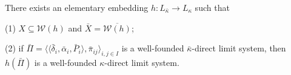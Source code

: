 There exists an elementary embedding $h: L_{\bar{\kappa}} \rightarrow L_{\kappa}$ such that

(1) $X \subseteq \mathcal{W}(h)$ and $\bar{X} = \overline{\mathcal{W}(h)}$;

(2) if $\bar{\Pi} = \langle \langle \bar{\delta}_i, \bar{\alpha}_i, \bar{P}_i \rangle, \bar{\pi}_{ij} \rangle_{i,j \in I}$ is a well-founded $\bar{\kappa}$-direct limit system, then $h(\bar{\Pi})$ is a well-founded $\kappa$-direct limit system.

